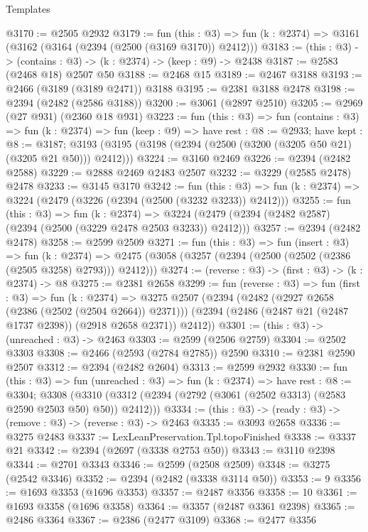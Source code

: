 \begin{lexlean}{Templates}
\begin{coremodule}
@3170 := @2505 @2932
@3179 := fun (this : @3) =>
  fun (k : @2374) => @3161 (@3162 (@3164 (@2394 (@2500 (@3169 @3170)) @2412)))
@3183 := (this : @3) -> (contains : @3) -> (k : @2374) -> (keep : @9) -> @2438
@3187 := @2583 (@2468 @18) @2507 @50
@3188 := @2468 @15
@3189 := @2467 @3188
@3193 := @2466 (@3189 (@3189 @2471)) @3188
@3195 := @2381 @3188 @2478
@3198 := @2394 (@2482 (@2586 @3188))
@3200 := @3061 (@2897 @2510)
@3205 := @2969 (@27 @931) (@2360 @18 @931)
@3223 := fun (this : @3) =>
  fun (contains : @3) =>
  fun (k : @2374) =>
  fun (keep : @9) =>
  have rest : @8 := @2933;
  have kept : @8 := @3187;
  @3193 (@3195 (@3198 (@2394 (@2500 (@3200 (@3205 @50 @21) (@3205 @21 @50))) @2412)))
@3224 := @3160 @2469
@3226 := @2394 (@2482 @2588)
@3229 := @2888 @2469 @2483 @2507
@3232 := @3229 (@2585 @2478) @2478
@3233 := @3145 @3170
@3242 := fun (this : @3) =>
  fun (k : @2374) => @3224 (@2479 (@3226 (@2394 (@2500 (@3232 @3233)) @2412)))
@3255 := fun (this : @3) =>
  fun (k : @2374) =>
  @3224 (@2479 (@2394 (@2482 @2587) (@2394 (@2500 (@3229 @2478 @2503 @3233)) @2412)))
@3257 := @2394 (@2482 @2478)
@3258 := @2599 @2509
@3271 := fun (this : @3) =>
  fun (insert : @3) =>
  fun (k : @2374) => @2475 (@3058 (@3257 (@2394 (@2500 (@2502 (@2386 (@2505 @3258) @2793))) @2412)))
@3274 := (reverse : @3) -> (first : @3) -> (k : @2374) -> @8
@3275 := @2381 @2658
@3299 := fun (reverse : @3) =>
  fun (first : @3) =>
  fun (k : @2374) =>
  @3275
    @2507
    (@2394
      (@2482 (@2927 @2658 (@2386 (@2502 (@2504 @2664)) @2371)))
      (@2394 (@2486 (@2487 @21 (@2487 @1737 @2398)) (@2918 @2658 @2371)) @2412))
@3301 := (this : @3) -> (unreached : @3) -> @2463
@3303 := @2599 (@2506 @2759)
@3304 := @2502 @3303
@3308 := @2466 (@2593 (@2784 @2785)) @2590
@3310 := @2381 @2590 @2507
@3312 := @2394 (@2482 @2604)
@3313 := @2599 @2932
@3330 := fun (this : @3) =>
  fun (unreached : @3) =>
  fun (k : @2374) =>
  have rest : @8 := @3304;
  @3308 (@3310 (@3312 (@2394 (@2792 (@3061 (@2502 @3313) (@2583 @2590 @2503 @50) @50)) @2412)))
@3334 := (this : @3) -> (ready : @3) -> (remove : @3) -> (reverse : @3) -> @2463
@3335 := @3093 @2658
@3336 := @3275 @2483
@3337 := LexLeanPreservation.Tpl.topoFinished
@3338 := @3337 @21
@3342 := @2394 (@2697 (@3338 @2753 @50))
@3343 := @3110 @2398
@3344 := @2701 @3343
@3346 := @2599 (@2508 @2509)
@3348 := @3275 (@2542 @3346)
@3352 := @2394 (@2482 (@3338 @3114 @50))
@3353 := 9
@3356 := @1693 @3353 (@1696 @3353)
@3357 := @2487 @3356
@3358 := 10
@3361 := @1693 @3358 (@1696 @3358)
@3364 := @3357 (@2487 @3361 @2398)
@3365 := @2486 @3364
@3367 := @2386 (@2477 @3109)
@3368 := @2477 @3356

\end{coremodule}
\end{lexlean}
